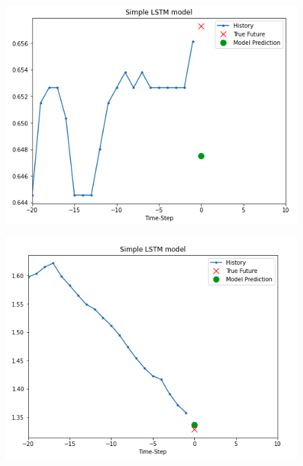 \vspace{-1cm}
\begin{center}
	\begin{figure}[htp]
		\begin{center}
			\includegraphics[scale=0.5]{./images/4.png}
		\end{center}
	\end{figure}
\end{center}




\vspace{-1cm}
\begin{center}
	\begin{figure}[htp]
		\begin{center}
			\includegraphics[scale=0.5]{./images/5.png}
		\end{center}
	\end{figure}
\end{center}



